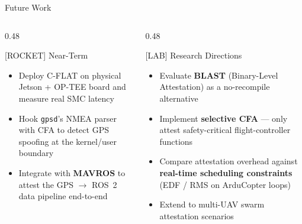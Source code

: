 \documentclass[aspectratio=169, 10pt]{beamer}
\begin{document}
\begin{frame}{Future Work}
    \begin{columns}[T]
        \begin{column}{0.48\textwidth}
            \begin{defbox}{[ROCKET] Near-Term}
                \begin{itemize}
                    \item Deploy C-FLAT on physical Jetson + OP-TEE board
                          and measure real SMC latency
                    \item Hook \texttt{gpsd}'s NMEA parser with CFA to
                          detect GPS spoofing at the kernel/user boundary
                    \item Integrate with \textbf{MAVROS} to attest the
                          GPS $\to$ ROS~2 data pipeline end-to-end
                \end{itemize}
            \end{defbox}
        \end{column}
        \begin{column}{0.48\textwidth}
            \begin{defbox}{[LAB] Research Directions}
                \begin{itemize}
                    \item Evaluate \textbf{BLAST} (Binary-Level Attestation)
                          as a no-recompile alternative
                    \item Implement \textbf{selective CFA} — only attest
                          safety-critical flight-controller functions
                    \item Compare attestation overhead against
                          \textbf{real-time scheduling constraints}
                          (EDF / RMS on ArduCopter loops)
                    \item Extend to multi-UAV swarm attestation scenarios
                \end{itemize}
            \end{defbox}
        \end{column}
    \end{columns}
\end{frame}
\end{document}
